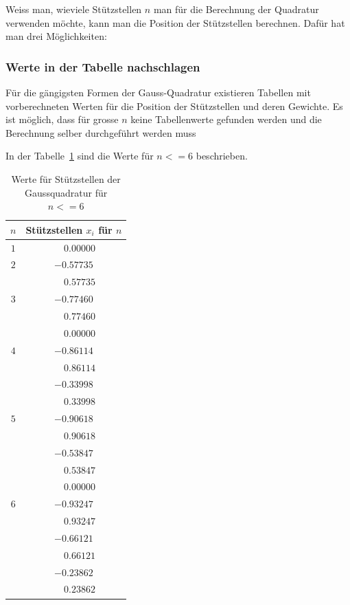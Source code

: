 Weiss man, wieviele Stützstellen $n$ man für die Berechnung der Quadratur verwenden möchte,
kann man die Position der Stützstellen berechnen. 
Dafür hat man drei Möglichkeiten:

\subsubsection{Werte in der Tabelle nachschlagen}
Für die gängigsten Formen der Gauss-Quadratur existieren Tabellen mit vorberechneten Werten für die
Position der Stützstellen und deren Gewichte. 
Es ist möglich, dass für grosse $n$ keine Tabellenwerte gefunden werden und die Berechnung 
selber durchgeführt werden muss

In der Tabelle~\ref{buch:table:gaussabscissenwerte} sind die Werte für $n <= 6$ beschrieben.

\begin{table}[h!]
    \centering
    \begin{tabular}{|c|c|}
        \hline
        $n$ & Stützstellen $x_{i}$ für $n$ \\
        \hline
        $1$ & $ \phantom{-} 0.00000 $ \\
        \hline
        $2$ & $ -0.57735 $ \\
            & $ \phantom{-} 0.57735 $ \\
        \hline
        $3$ & $ -0.77460 $ \\
            & $ \phantom{-} 0.77460 $ \\
            & $ \phantom{-} 0.00000 $ \\
        \hline
        $4$ & $ -0.86114 $ \\
            & $ \phantom{-} 0.86114 $ \\
            & $ -0.33998 $ \\
            & $ \phantom{-} 0.33998 $ \\
        \hline
        $5$ & $ -0.90618 $ \\
            & $ \phantom{-} 0.90618 $ \\
            & $ -0.53847 $ \\
            & $ \phantom{-} 0.53847 $ \\
            & $ \phantom{-} 0.00000 $ \\
        \hline
        $6$ & $ -0.93247 $ \\
            & $ \phantom{-} 0.93247 $ \\
            & $ -0.66121 $ \\
            & $ \phantom{-} 0.66121 $ \\
            & $ -0.23862 $ \\
            & $ \phantom{-} 0.23862 $ \\
        \hline
    \end{tabular}
    \caption{Werte für Stützstellen der Gaussquadratur für $n <= 6$
    \label{buch:table:gaussabscissenwerte}}    
\end{table}


